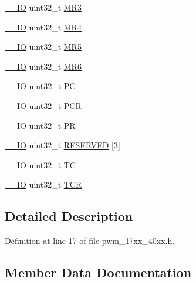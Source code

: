 \begin{DoxyCompactItemize}
\item 
\hyperlink{core__cm3_8h_aec43007d9998a0a0e01faede4133d6be}{\+\_\+\+\_\+\+IO} uint32\+\_\+t \hyperlink{structLPC__PWM__T_a583c387b086f01616e2d8cd8561a9940}{M\+R3}
\item 
\hyperlink{core__cm3_8h_aec43007d9998a0a0e01faede4133d6be}{\+\_\+\+\_\+\+IO} uint32\+\_\+t \hyperlink{structLPC__PWM__T_a8c92099279bc1cf0c6f8c1911c23d2ea}{M\+R4}
\item 
\hyperlink{core__cm3_8h_aec43007d9998a0a0e01faede4133d6be}{\+\_\+\+\_\+\+IO} uint32\+\_\+t \hyperlink{structLPC__PWM__T_aefea3255575d4e9dd6d534fb080f8e2a}{M\+R5}
\item 
\hyperlink{core__cm3_8h_aec43007d9998a0a0e01faede4133d6be}{\+\_\+\+\_\+\+IO} uint32\+\_\+t \hyperlink{structLPC__PWM__T_ab794c0c2f7bed133dde9a1d033bc22f9}{M\+R6}
\item 
\hyperlink{core__cm3_8h_aec43007d9998a0a0e01faede4133d6be}{\+\_\+\+\_\+\+IO} uint32\+\_\+t \hyperlink{structLPC__PWM__T_af5746645a562488fc02d1f4c05910e0e}{PC}
\item 
\hyperlink{core__cm3_8h_aec43007d9998a0a0e01faede4133d6be}{\+\_\+\+\_\+\+IO} uint32\+\_\+t \hyperlink{structLPC__PWM__T_a242485f18e62428c32fb61b4680a1772}{P\+CR}
\item 
\hyperlink{core__cm3_8h_aec43007d9998a0a0e01faede4133d6be}{\+\_\+\+\_\+\+IO} uint32\+\_\+t \hyperlink{structLPC__PWM__T_a8ffa99e04366429b8ae53ba115de716b}{PR}
\item 
\hyperlink{core__cm3_8h_aec43007d9998a0a0e01faede4133d6be}{\+\_\+\+\_\+\+IO} uint32\+\_\+t \hyperlink{structLPC__PWM__T_a417c4f30b4131f0959ba126c4aa0a13b}{R\+E\+S\+E\+R\+V\+ED} \mbox{[}3\mbox{]}
\item 
\hyperlink{core__cm3_8h_aec43007d9998a0a0e01faede4133d6be}{\+\_\+\+\_\+\+IO} uint32\+\_\+t \hyperlink{structLPC__PWM__T_a844caaab8bd038a17228927a1f98253e}{TC}
\item 
\hyperlink{core__cm3_8h_aec43007d9998a0a0e01faede4133d6be}{\+\_\+\+\_\+\+IO} uint32\+\_\+t \hyperlink{structLPC__PWM__T_a1f24593dc70462c02ef71dc3fc5591af}{T\+CR}
\end{DoxyCompactItemize}


\subsection{Detailed Description}


Definition at line 17 of file pwm\+\_\+17xx\+\_\+40xx.\+h.



\subsection{Member Data Documentation}
